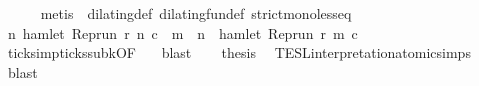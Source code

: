 \begin{isabellebody}
\ \ \ \ \isamarkupfalse%
\ {\isacharparenleft}metis\ {\isacharasterisk}\ dilating{\isacharunderscore}def\ dilating{\isacharunderscore}fun{\isacharunderscore}def\ strict{\isacharunderscore}mono{\isacharunderscore}less{\isacharunderscore}eq{\isacharparenright}\isanewline
\ \ \isamarkupfalse%
\ {\isacartoucheopen}{\isasymforall}n{\isachardot}\ hamlet\ {\isacharparenleft}Rep{\isacharunderscore}run\ r\ n\ c\ {\isasymlongrightarrow}\ {\isacharparenleft}{\isasymforall}m\ {\isasymge}\ n{\isachardot}\ {\isasymnot}\ hamlet\ {\isacharparenleft}Rep{\isacharunderscore}run\ r\ m\ c\isanewline
\ \ \ \ \isamarkupfalse%
\ ticks{\isacharunderscore}imp{\isacharunderscore}ticks{\isacharunderscore}subk{\isacharbrackleft}OF\ {\isacharasterisk}{\isacharbrackright}\ \isamarkupfalse%
\ blast\isanewline
\ \ \isamarkupfalse%
\ {\isacharquery}thesis\ \isamarkupfalse%
\ TESL{\isacharunderscore}interpretation{\isacharunderscore}atomic{\isachardot}simps{\isacharparenleft}{}{\isacharparenright}\ \isamarkupfalse%
\ blast\isanewline
{}\isamarkupfalse%
%
\endisatagproof
{\isafoldproof}%
%
\isadelimproof
\isanewline
%
\endisadelimproof
%
\isadelimtheory
\isanewline
%
\endisadelimtheory
%
\isatagtheory
{}\isamarkupfalse%
%
\endisatagtheory
{\isafoldtheory}%
%
\isadelimtheory
%
\endisadelimtheory
%
\end{isabellebody}%
\endinput
